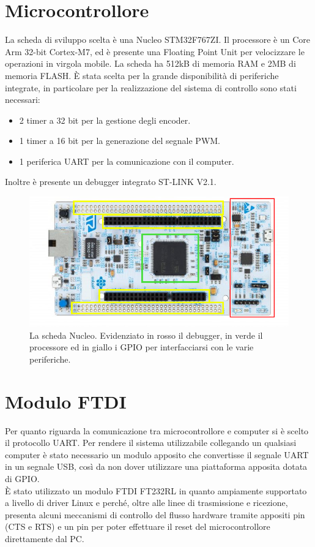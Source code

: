 \section{Microcontrollore}
La scheda di sviluppo scelta è una Nucleo STM32F767ZI.
Il processore è un Core Arm 32-bit Cortex-M7, ed è presente una Floating Point Unit per velocizzare le operazioni in virgola mobile.
La scheda ha 512kB di memoria RAM e 2MB di memoria FLASH.
È stata scelta per la grande disponibilità di periferiche integrate, in particolare per la realizzazione del sistema di controllo sono stati necessari: 
\begin{itemize}
    \item 2 timer a 32 bit per la gestione degli encoder.
    \item 1 timer a 16 bit per la generazione del segnale PWM.
    \item 1 periferica UART per la comunicazione con il computer.
\end{itemize}
Inoltre è presente un debugger integrato ST-LINK V2.1.

\begin{figure}[H]
\centering
\includegraphics[scale=0.65]{images/nucleo.png}
\caption{La scheda Nucleo. Evidenziato in rosso il debugger, in verde il processore ed in giallo i GPIO per interfacciarsi con le varie periferiche.}
\end{figure}

\section{Modulo FTDI}
Per quanto riguarda la comunicazione tra microcontrollore e computer si è scelto il protocollo UART. 
Per rendere il sistema utilizzabile collegando un qualsiasi computer è stato necessario un modulo apposito che convertisse il segnale UART in un segnale USB, così da non dover utilizzare una piattaforma apposita dotata di GPIO. \\
È stato utilizzato un modulo FTDI FT232RL in quanto ampiamente supportato a livello di driver Linux e perché, oltre alle linee di trasmissione e ricezione, presenta alcuni meccanismi di controllo del flusso hardware tramite appositi pin (CTS e RTS) e un pin per poter effettuare il reset del microcontrollore direttamente dal PC. \\

